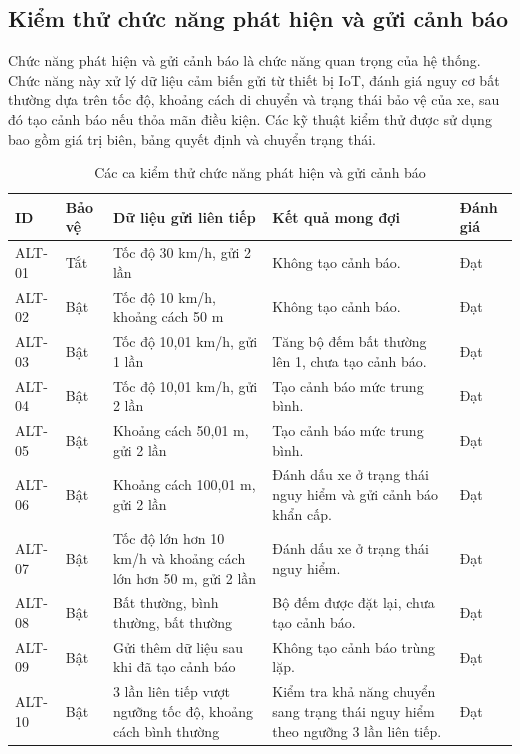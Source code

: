 \documentclass[../DoAn.tex]{subfiles}
\begin{document}
\subsection{Kiểm thử chức năng phát hiện và gửi cảnh báo}

Chức năng phát hiện và gửi cảnh báo là chức năng quan trọng của hệ thống. Chức năng này xử lý dữ liệu cảm biến gửi từ thiết bị IoT, đánh giá nguy cơ bất thường dựa trên tốc độ, khoảng cách di chuyển và trạng thái bảo vệ của xe, sau đó tạo cảnh báo nếu thỏa mãn điều kiện. Các kỹ thuật kiểm thử được sử dụng bao gồm giá trị biên, bảng quyết định và chuyển trạng thái.
\begin{table}[H]
\centering
\renewcommand{\arraystretch}{1.3}
\begin{tabular}{|p{}|p{}|p{}|p{}|p{}|}
\hline
\textbf{ID} & \textbf{Bảo vệ} & \textbf{Dữ liệu gửi liên tiếp} & \textbf{Kết quả mong đợi} & \textbf{Đánh giá} \\ \hline
ALT-01 & Tắt & Tốc độ 30 km/h, gửi 2 lần & Không tạo cảnh báo. & Đạt \\ \hline
ALT-02 & Bật & Tốc độ 10 km/h, khoảng cách 50 m & Không tạo cảnh báo. & Đạt \\ \hline
ALT-03 & Bật & Tốc độ 10,01 km/h, gửi 1 lần & Tăng bộ đếm bất thường lên 1, chưa tạo cảnh báo. & Đạt \\ \hline
ALT-04 & Bật & Tốc độ 10,01 km/h, gửi 2 lần & Tạo cảnh báo mức trung bình. & Đạt \\ \hline
ALT-05 & Bật & Khoảng cách 50,01 m, gửi 2 lần & Tạo cảnh báo mức trung bình. & Đạt \\ \hline
ALT-06 & Bật & Khoảng cách 100,01 m, gửi 2 lần & Đánh dấu xe ở trạng thái nguy hiểm và gửi cảnh báo khẩn cấp. & Đạt \\ \hline
ALT-07 & Bật & Tốc độ lớn hơn 10 km/h và khoảng cách lớn hơn 50 m, gửi 2 lần & Đánh dấu xe ở trạng thái nguy hiểm. & Đạt \\ \hline
ALT-08 & Bật & Bất thường, bình thường, bất thường & Bộ đếm được đặt lại, chưa tạo cảnh báo. & Đạt \\ \hline
ALT-09 & Bật & Gửi thêm dữ liệu sau khi đã tạo cảnh báo & Không tạo cảnh báo trùng lặp. & Đạt \\ \hline
ALT-10 & Bật & 3 lần liên tiếp vượt ngưỡng tốc độ, khoảng cách bình thường & Kiểm tra khả năng chuyển sang trạng thái nguy hiểm theo ngưỡng 3 lần liên tiếp. & Đạt \\ \hline
\end{tabular}
\caption{Các ca kiểm thử chức năng phát hiện và gửi cảnh báo}
\label{tab:test-alert}
\end{table}
\end{document}
